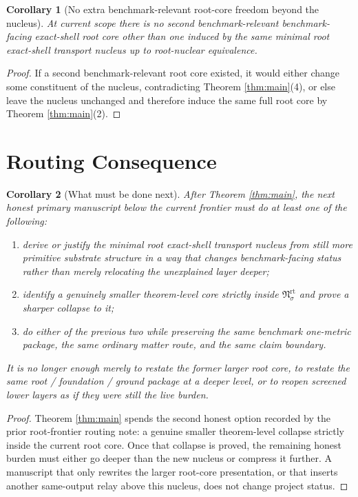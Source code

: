 \documentclass[11pt]{article}
\newcommand{\RootNucleus}[1]{\mathfrak N_{#1}^{\mathrm{rt}}}
\newtheorem{corollary}{Corollary}
\begin{document}
\begin{corollary}[No extra benchmark-relevant root-core freedom beyond the nucleus]
\label{cor:nofreedom}
At current scope there is no second benchmark-relevant benchmark-facing exact-shell root core other than one induced by the same minimal root exact-shell transport nucleus up to root-nuclear equivalence.
\end{corollary}

\begin{proof}
If a second benchmark-relevant root core existed, it would either change some constituent of the nucleus, contradicting Theorem \ref{thm:main}(4), or else leave the nucleus unchanged and therefore induce the same full root core by Theorem \ref{thm:main}(2).
\end{proof}

\section{Routing Consequence}

\begin{corollary}[What must be done next]
\label{cor:next}
After Theorem \ref{thm:main}, the next honest primary manuscript below the current frontier must do at least one of the following:
\begin{enumerate}
    \item derive or justify the minimal root exact-shell transport nucleus from still more primitive substrate structure in a way that changes benchmark-facing status rather than merely relocating the unexplained layer deeper;
    \item identify a genuinely smaller theorem-level core strictly inside \(\RootNucleus{\sigma}\) and prove a sharper collapse to it;
    \item do either of the previous two while preserving the same benchmark one-metric package, the same ordinary matter route, and the same claim boundary.
\end{enumerate}
It is no longer enough merely to restate the former larger root core, to restate the same root / foundation / ground package at a deeper level, or to reopen screened lower layers as if they were still the live burden.
\end{corollary}

\begin{proof}
Theorem \ref{thm:main} spends the second honest option recorded by the prior root-frontier routing note: a genuine smaller theorem-level collapse strictly inside the current root core. Once that collapse is proved, the remaining honest burden must either go deeper than the new nucleus or compress it further. A manuscript that only rewrites the larger root-core presentation, or that inserts another same-output relay above this nucleus, does not change project status.
\end{proof}
\end{document}
